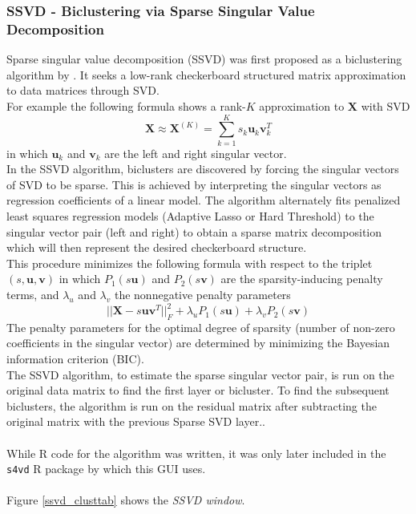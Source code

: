 \documentclass[a4paper]{article}\usepackage[]{graphicx}\usepackage[]{color}
\begin{document}
\subsubsection{SSVD - Biclustering via Sparse Singular Value Decomposition}
Sparse singular value decomposition (SSVD) was first proposed as a biclustering
algorithm by \citet{Lee2010}. It seeks a low-rank checkerboard structured
matrix approximation to data matrices through SVD. \\
For example the following formula shows a rank-$K$ approximation to $\mathbf{X}$
with SVD
$$
\mathbf{X} \approx \mathbf{X}^{(K)} = \sum_{k=1}^K s_k \mathbf{u}_k \mathbf{v}_k^T
$$
in which $\mathbf{u}_k$ and $\mathbf{v}_k$ are the left and right singular
vector.\\
In the SSVD algorithm, biclusters are discovered by forcing the singular
vectors of SVD to be sparse. This is achieved by interpreting the singular
vectors as regression coefficients of a linear model. The algorithm alternately
fits penalized least squares regression models (Adaptive Lasso or Hard
Threshold) to the singular vector pair (left and right) to obtain a sparse matrix decomposition which will then represent the desired checkerboard structure.\\
This procedure minimizes the following formula with respect to the triplet
$(s,\mathbf{u},\mathbf{v})$ in which $P_1 (s \mathbf{u})$ and $P_2 (s
\mathbf{v})$ are the sparsity-inducing penalty terms, and $\lambda_u$ and
$\lambda_v$ the nonnegative penalty parameters
$$
|| \mathbf{X} - s \mathbf{u} \mathbf{v}^T ||^2_F + \lambda_u P_1 (s \mathbf{u}) + \lambda_v P_2 (s \mathbf{v})
$$
The penalty parameters for the optimal degree of sparsity (number of non-zero
coefficients in the singular vector) are determined by minimizing the Bayesian
information criterion (BIC).\\
The SSVD algorithm, to estimate the sparse singular vector pair, is run on the
original data matrix to find the first layer or bicluster. To find the
subsequent biclusters, the algorithm is run on the residual matrix after
subtracting the original matrix with the previous Sparse SVD layer..
\\ \\
While R code for the algorithm was written, it was only later included in the
\texttt{s4vd} R package by \citet{Sill2011a} which this GUI uses.
\\ \\
Figure \ref{ssvd_clusttab} shows the {\it SSVD window}.
\end{document}
